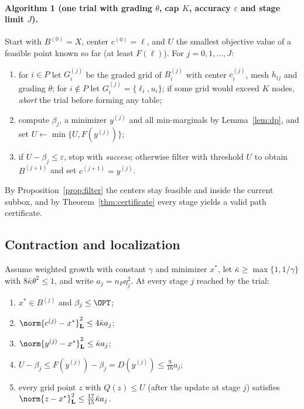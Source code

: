 \paragraph{Algorithm 1 (one trial with grading $\theta$, cap $K$, accuracy
$\varepsilon$ and stage limit $J$).}
Start with $B^{(0)}=X$, center $c^{(0)}=\ell$, and $U$ the smallest objective
value of a feasible point known so far (at least $F(\ell)$). For
$j=0,1,\dots,J$:
\begin{enumerate}[label=(\roman*)]
\item for $i\in P$ let $G_i^{(j)}$ be the graded grid of $B_i^{(j)}$ with center
$c_i^{(j)}$, mesh $h_{ij}$ and grading $\theta$; for $i\notin P$ let
$G_i^{(j)}=\{\ell_i,u_i\}$; if some grid would exceed $K$ nodes, \emph{abort} the
trial before forming any table;
\item compute $\beta_j$, a minimizer $y^{(j)}$ and all min-marginals by
Lemma~\ref{lem:dp}, and set $U\leftarrow\min\{U,F(y^{(j)})\}$;
\item if $U-\beta_j\le\varepsilon$, stop with \emph{success}; otherwise filter
with threshold $U$ to obtain $B^{(j+1)}$ and set $c^{(j+1)}=y^{(j)}$.
\end{enumerate}
By Proposition~\ref{prop:filter} the centers stay feasible and inside the
current subbox, and by Theorem~\ref{thm:certificate} every stage yields a
valid path certificate.

\subsection{Contraction and localization}

\begin{lemma}\label{lem:inv}
Assume weighted growth with constant $\gamma$ and minimizer $x^*$, let
$\bar\kappa\ge\max\{1,1/\gamma\}$ with $8\bar\kappa\theta^2\le1$, and write
$a_j=n_P\eta_j^2$. At every stage $j$ reached by the trial:
\begin{enumerate}[label=(\roman*)]
\item $x^*\in B^{(j)}$ and $\beta_j\le\OPT$;
\item $\norm{c^{(j)}-x^*}_{\mathbf L}^2\le4\bar\kappa a_j$;
\item $\norm{y^{(j)}-x^*}_{\mathbf L}^2\le\bar\kappa a_j$;
\item $U-\beta_j\le F(y^{(j)})-\beta_j=D(y^{(j)})\le\frac9{16}a_j$;
\item every grid point $z$ with $Q(z)\le U$ (after the update at stage $j$)
satisfies $\norm{z-x^*}_{\mathbf L}^2\le\frac{17}{15}\bar\kappa a_j$.
\end{enumerate}
\end{lemma}

